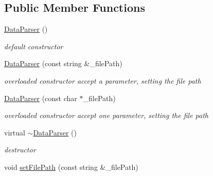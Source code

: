 \subsection*{\-Public \-Member \-Functions}
\begin{DoxyCompactItemize}
\item 
\hypertarget{classDataParser_adde3fdb08b6d298dac0bdf59b94d77c9}{\hyperlink{classDataParser_adde3fdb08b6d298dac0bdf59b94d77c9}{\-Data\-Parser} ()}\label{classDataParser_adde3fdb08b6d298dac0bdf59b94d77c9}

\begin{DoxyCompactList}\small\item\em default constructor \end{DoxyCompactList}\item 
\hypertarget{classDataParser_afbf1e7cdc1bde9fa75cdb4bead409c5f}{\hyperlink{classDataParser_afbf1e7cdc1bde9fa75cdb4bead409c5f}{\-Data\-Parser} (const string \&\-\_\-file\-Path)}\label{classDataParser_afbf1e7cdc1bde9fa75cdb4bead409c5f}

\begin{DoxyCompactList}\small\item\em overloaded constructor accept a parameter, setting the file path \end{DoxyCompactList}\item 
\hypertarget{classDataParser_a6df8b2ad220ec78e9a5155543392051a}{\hyperlink{classDataParser_a6df8b2ad220ec78e9a5155543392051a}{\-Data\-Parser} (const char $\ast$\-\_\-file\-Path)}\label{classDataParser_a6df8b2ad220ec78e9a5155543392051a}

\begin{DoxyCompactList}\small\item\em overloaded constructor accept one parameter, setting the file path \end{DoxyCompactList}\item 
\hypertarget{classDataParser_a4ac09e3a8b888b204e23052be8e1ec80}{virtual \hyperlink{classDataParser_a4ac09e3a8b888b204e23052be8e1ec80}{$\sim$\-Data\-Parser} ()}\label{classDataParser_a4ac09e3a8b888b204e23052be8e1ec80}

\begin{DoxyCompactList}\small\item\em destructor \end{DoxyCompactList}\item 
\hypertarget{classDataParser_a2d1d731f6e78f45a1d5e683aa2cc47c0}{void \hyperlink{classDataParser_a2d1d731f6e78f45a1d5e683aa2cc47c0}{set\-File\-Path} (const string \&\-\_\-file\-Path)}\label{classDataParser_a2d1d731f6e78f45a1d5e683aa2cc47c0}


\end{DoxyCompactItemize}
